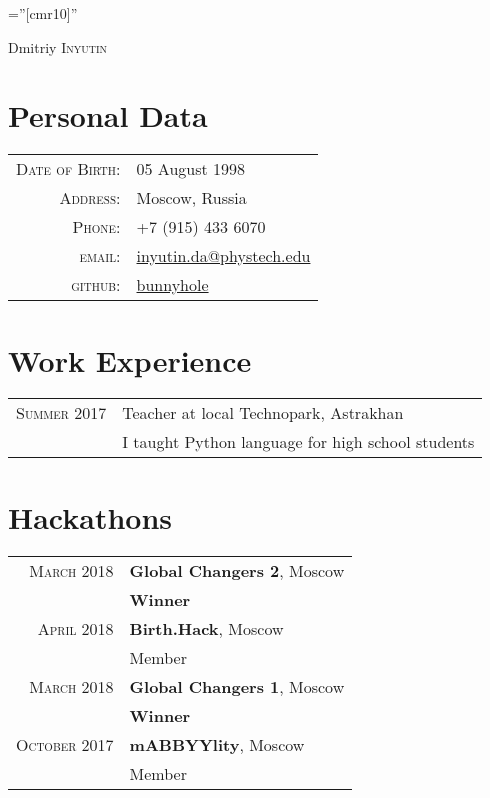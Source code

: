 \documentclass[a4paper,10pt]{article}
\begin{document}
\pagestyle{empty} 

\font\fb=''[cmr10]'' 


\par{\centering
		{\Huge Dmitriy \textsc{Inyutin}
	}\bigskip\par}


\section{Personal Data}

\begin{tabular}{rl}
    \textsc{Date of Birth:} & 05 August 1998 \\
    \textsc{Address:}   & Moscow, Russia \\
    \textsc{Phone:}     & +7 (915) 433 6070 \\
    \textsc{email:}     &  \href{mailto:alessandro.plasmati@gmail.com}{inyutin.da@phystech.edu} \\
    \textsc{github:}    &  \href{https://github.com/bunnyhole}{bunnyhole} \\
\end{tabular}

\section{Work Experience}
\begin{tabular}{r|p{11cm}}
    \textsc{Summer 2017} & Teacher at local Technopark, Astrakhan\\&\footnotesize{I taught Python language for high school students} \\
\end{tabular}

\section{Hackathons}
\begin{tabular}{rl}
\textsc{March 2018}  &  \textbf{Global Changers 2}, Moscow\\
& \small\emph{}\textbf{Winner}\\
 \textsc{April 2018}  &  \textbf{Birth.Hack}, Moscow\\
& \small\emph{}Member\\
\textsc{March 2018}  &  \textbf{Global Changers 1}, Moscow\\
& \small\emph{}\textbf{Winner}\\
\textsc{October 2017}  & \textbf{mABBYYlity}, Moscow\\
& \small\emph{}Member\\
\end{tabular}
\end{document}
